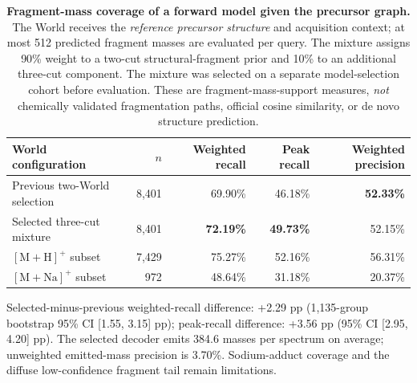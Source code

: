 \begin{table}[!htbp]
\centering
\caption{\textbf{Fragment-mass coverage of a forward model given the precursor graph.} The World receives the \emph{reference precursor structure} and acquisition context; at most 512 predicted fragment masses are evaluated per query. The mixture assigns 90\% weight to a two-cut structural-fragment prior and 10\% to an additional three-cut component. The mixture was selected on a separate model-selection cohort before evaluation. These are fragment-mass-support measures, \emph{not} chemically validated fragmentation paths, official cosine similarity, or de novo structure prediction.}
\label{tab:msdev_world}
\small
\setlength{\tabcolsep}{5pt}
\begin{tabular}{lrrrr}
\toprule
World configuration & $n$ & Weighted recall & Peak recall & Weighted precision \\
\midrule
Previous two-World selection & 8,401 & 69.90\% & 46.18\% & \textbf{52.33\%} \\
Selected three-cut mixture & 8,401 & \textbf{72.19\%} & \textbf{49.73\%} & 52.15\% \\
\quad $[\mathrm{M+H}]^+$ subset & 7,429 & 75.27\% & 52.16\% & 56.31\% \\
\quad $[\mathrm{M+Na}]^+$ subset & 972 & 48.64\% & 31.18\% & 20.37\% \\
\bottomrule
\end{tabular}

\vspace{3pt}
\begin{minipage}{0.97\linewidth}\footnotesize
Selected-minus-previous weighted-recall difference: +2.29 pp (1,135-group bootstrap 95\% CI [1.55, 3.15] pp); peak-recall difference: +3.56 pp (95\% CI [2.95, 4.20] pp). The selected decoder emits 384.6 masses per spectrum on average; unweighted emitted-mass precision is 3.70\%. Sodium-adduct coverage and the diffuse low-confidence fragment tail remain limitations.
\end{minipage}
\end{table}

